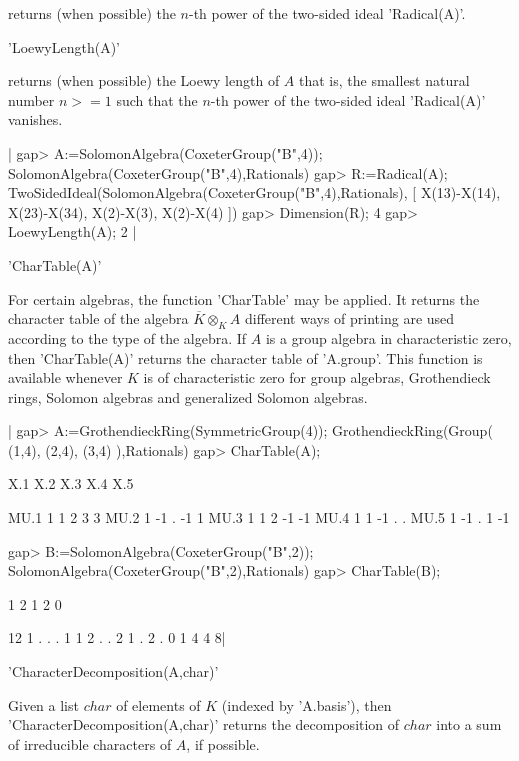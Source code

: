 returns (when possible) the $n$-th power of the two-sided ideal 'Radical(A)'.

'LoewyLength(A)'

returns  (when  possible)  the  Loewy  length  of $A$ that is, the smallest
natural  number $n >= 1$ such that  the $n$-th power of the two-sided ideal
'Radical(A)' vanishes.

|    gap> A:=SolomonAlgebra(CoxeterGroup("B",4));
    SolomonAlgebra(CoxeterGroup("B",4),Rationals)
    gap> R:=Radical(A);
    TwoSidedIdeal(SolomonAlgebra(CoxeterGroup("B",4),Rationals),
    [ X(13)-X(14), X(23)-X(34), X(2)-X(3), X(2)-X(4) ])
    gap> Dimension(R);
    4
    gap> LoewyLength(A);
    2 |

'CharTable(A)'

For  certain algebras, the function 'CharTable'  may be applied. It returns
the  character table of  the algebra $\overline{K}  \otimes_K A$\: different
ways of printing are used according to the type of the algebra. If $A$ is a
group  algebra  in  characteristic  zero,  then  'CharTable(A)' returns the
character table of 'A.group'. This function is available whenever $K$ is of
characteristic   zero  for  group  algebras,  Grothendieck  rings,  Solomon
algebras and generalized Solomon algebras.

|    gap> A:=GrothendieckRing(SymmetricGroup(4));
    GrothendieckRing(Group( (1,4), (2,4), (3,4) ),Rationals)
    gap> CharTable(A);

         X.1 X.2 X.3 X.4 X.5

    MU.1   1   1   2   3   3
    MU.2   1  -1   .  -1   1
    MU.3   1   1   2  -1  -1
    MU.4   1   1  -1   .   .
    MU.5   1  -1   .   1  -1

    gap> B:=SolomonAlgebra(CoxeterGroup("B",2));
    SolomonAlgebra(CoxeterGroup("B",2),Rationals)
    gap> CharTable(B);

         1
         2  1  2  0

    12   1  .  .  .
     1   1  2  .  .
     2   1  .  2  .
     0   1  4  4  8|

'CharacterDecomposition(A,char)'

Given  a  list  $char$  of  elements  of  $K$  (indexed by 'A.basis'), then
'CharacterDecomposition(A,char)' returns the decomposition of $char$ into a
sum of irreducible characters of $A$, if possible.

